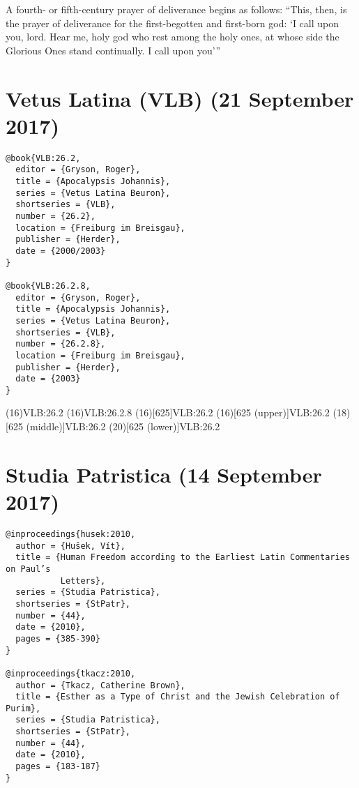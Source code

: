 \documentclass[a4paper]{article}
\begin{document}
\begin{verbcite}
  A fourth- or fifth-century prayer of deliverance begins as follows: “This,
  then, is the prayer of deliverance for the first-begotten and first-born
  god: ‘I call upon you, lord. Hear me, holy god who rest among the holy ones,
  at whose side the Glorious Ones stand continually. I call upon you’”
  \parencite[( \mkbibbrackets{O'Neil in Betz})]{PGM}
\end{verbcite}
\nocite{preisendaz:1973-1974}
\exampleabbreviations
\examplebibliography
{}

\section{Vetus Latina (VLB) (21 September 2017)}

\begin{verbatim}
@book{VLB:26.2,
  editor = {Gryson, Roger},
  title = {Apocalypsis Johannis},
  series = {Vetus Latina Beuron},
  shortseries = {VLB},
  number = {26.2},
  location = {Freiburg im Breisgau},
  publisher = {Herder},
  date = {2000/2003}
}

@book{VLB:26.2.8,
  editor = {Gryson, Roger},
  title = {Apocalypsis Johannis},
  series = {Vetus Latina Beuron},
  shortseries = {VLB},
  number = {26.2.8},
  location = {Freiburg im Breisgau},
  publisher = {Herder},
  date = {2003}
}
\end{verbatim}

\examplecite(16){VLB:26.2}
\examplecite(16){VLB:26.2.8}
\citereset
\examplecite(16)[625]{VLB:26.2}
\citereset
\examplecite(16)[625 \mkbibparens{upper}]{VLB:26.2}
\examplecite(18)[625 \mkbibparens{middle}]{VLB:26.2}
\examplecite(20)[625 \mkbibparens{lower}]{VLB:26.2}
\exampleabbreviations
\examplebibliography
{}

\section{Studia Patristica (14 September 2017)}

\begin{verbatim}
@inproceedings{husek:2010,
  author = {Hušek, Vít},
  title = {Human Freedom according to the Earliest Latin Commentaries on Paul’s
           Letters},
  series = {Studia Patristica},
  shortseries = {StPatr},
  number = {44},
  date = {2010},
  pages = {385-390}
}

@inproceedings{tkacz:2010,
  author = {Tkacz, Catherine Brown},
  title = {Esther as a Type of Christ and the Jewish Celebration of Purim},
  series = {Studia Patristica},
  shortseries = {StPatr},
  number = {44},
  date = {2010},
  pages = {183-187}
}
\end{verbatim}
\end{document}
